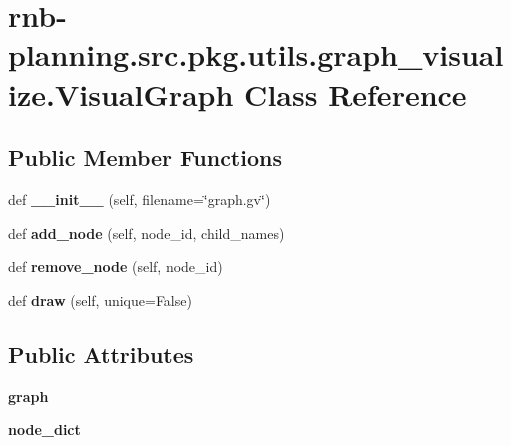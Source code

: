 \hypertarget{classrnb-planning_1_1src_1_1pkg_1_1utils_1_1graph__visualize_1_1_visual_graph}{}\section{rnb-\/planning.src.\+pkg.\+utils.\+graph\+\_\+visualize.\+Visual\+Graph Class Reference}
\label{classrnb-planning_1_1src_1_1pkg_1_1utils_1_1graph__visualize_1_1_visual_graph}
\subsection*{Public Member Functions}
\begin{DoxyCompactItemize}
\item 
\mbox{\label{classrnb-planning_1_1src_1_1pkg_1_1utils_1_1graph__visualize_1_1_visual_graph_a81f37a43e2bbcf9733a9ad1693c42801}} 
def {\bfseries \+\_\+\+\_\+init\+\_\+\+\_\+} (self, filename=\char`\"{}graph.\+gv\char`\"{})
\item 
\mbox{\label{classrnb-planning_1_1src_1_1pkg_1_1utils_1_1graph__visualize_1_1_visual_graph_a5017bdd0be0245090f844c6dfb0229ef}} 
def {\bfseries add\+\_\+node} (self, node\+\_\+id, child\+\_\+names)
\item 
\mbox{\label{classrnb-planning_1_1src_1_1pkg_1_1utils_1_1graph__visualize_1_1_visual_graph_acd5c244dd24fecd2ec9f8cc432f1f9cf}} 
def {\bfseries remove\+\_\+node} (self, node\+\_\+id)
\item 
\mbox{\label{classrnb-planning_1_1src_1_1pkg_1_1utils_1_1graph__visualize_1_1_visual_graph_a655b0343f1f30048fcb9b7a37403917a}} 
def {\bfseries draw} (self, unique=False)
\end{DoxyCompactItemize}
\subsection*{Public Attributes}
\begin{DoxyCompactItemize}
\item 
\mbox{\label{classrnb-planning_1_1src_1_1pkg_1_1utils_1_1graph__visualize_1_1_visual_graph_a5dd53da3c95c6426aa79fddb2cd255c5}} 
{\bfseries graph}
\item 
\mbox{\label{classrnb-planning_1_1src_1_1pkg_1_1utils_1_1graph__visualize_1_1_visual_graph_a94542d479ce379cd6e91c73afbad0baa}} 
{\bfseries node\+\_\+dict}
\end{DoxyCompactItemize}


